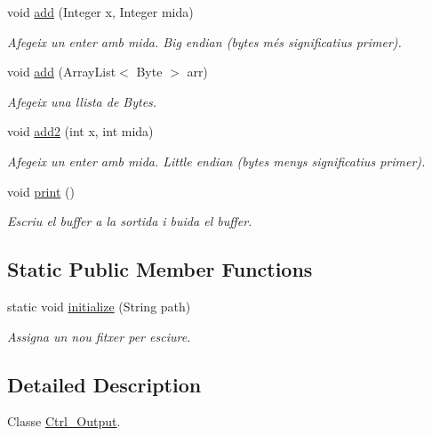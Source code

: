 \begin{DoxyCompactItemize}
void \hyperlink{classpersistencia_1_1output_1_1Ctrl__Output_ac792cc55e30c9c769e10a20c2dd41bc8}{add} (Integer x, Integer mida)
\begin{DoxyCompactList}\small\item\em Afegeix un enter amb mida. Big endian (bytes més significatius primer). \end{DoxyCompactList}\item 
void \hyperlink{classpersistencia_1_1output_1_1Ctrl__Output_a5fb2f07198a77b4fac0f95ee48e3d0b9}{add} (Array\+List$<$ Byte $>$ arr)
\begin{DoxyCompactList}\small\item\em Afegeix una llista de Bytes. \end{DoxyCompactList}\item 
void \hyperlink{classpersistencia_1_1output_1_1Ctrl__Output_ad4738467c2312b0e079c14003e548dd6}{add2} (int x, int mida)
\begin{DoxyCompactList}\small\item\em Afegeix un enter amb mida. Little endian (bytes menys significatius primer). \end{DoxyCompactList}\item 
void \hyperlink{classpersistencia_1_1output_1_1Ctrl__Output_a908955c29bfecc7ebac86613bc75e9ed}{print} ()
\begin{DoxyCompactList}\small\item\em Escriu el buffer a la sortida i buida el buffer. \end{DoxyCompactList}\end{DoxyCompactItemize}
\subsection*{Static Public Member Functions}
\begin{DoxyCompactItemize}
\item 
static void \hyperlink{classpersistencia_1_1output_1_1Ctrl__Output_a83bd01197acdeb0a697f21ca9854c457}{initialize} (String path)
\begin{DoxyCompactList}\small\item\em Assigna un nou fitxer per esciure. \end{DoxyCompactList}\end{DoxyCompactItemize}


\subsection{Detailed Description}
Classe \hyperlink{classpersistencia_1_1output_1_1Ctrl__Output}{Ctrl\+\_\+\+Output}. 


